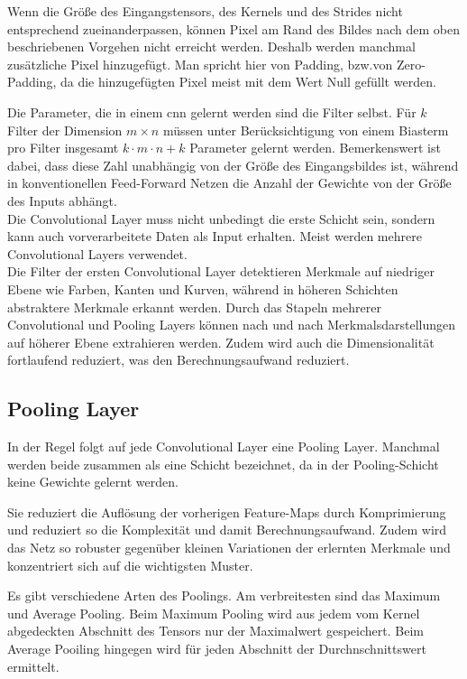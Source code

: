 Wenn die Größe des Eingangstensors, des Kernels und des Strides nicht entsprechend zueinanderpassen, können Pixel 
am Rand des Bildes nach dem oben beschriebenen Vorgehen nicht erreicht werden. Deshalb werden manchmal zusätzliche 
Pixel hinzugefügt. Man spricht hier von Padding, bzw.von Zero-Padding, da die hinzugefügten Pixel meist mit dem Wert Null 
gefüllt werden. \cite{Michelucci:2019}

Die Parameter, die in einem \ac{cnn} gelernt werden sind die Filter selbst. Für $k$ Filter der Dimension $m \times n$ 
müssen unter Berücksichtigung von einem Biasterm pro Filter insgesamt $k \cdot m \cdot n + k$ Parameter gelernt werden. 
Bemerkenswert ist dabei, dass diese Zahl unabhängig von der Größe des Eingangsbildes ist, während in konventionellen 
Feed-Forward Netzen die Anzahl der Gewichte von der Größe des Inputs abhängt.\cite{Michelucci:2019}\\

Die Convolutional Layer muss nicht unbedingt die erste Schicht sein, sondern kann auch vorverarbeitete Daten 
als Input erhalten. Meist werden mehrere Convolutional Layers verwendet.\cite{Michelucci:2019}\\
Die Filter der ersten Convolutional Layer detektieren Merkmale auf niedriger Ebene wie Farben, Kanten und Kurven, 
während in höheren Schichten abstraktere Merkmale erkannt werden. Durch das Stapeln mehrerer Convolutional 
und Pooling Layers können nach und nach Merkmalsdarstellungen auf höherer Ebene extrahieren werden. 
Zudem wird auch die Dimensionalität fortlaufend reduziert, was den Berechnungsaufwand reduziert. 
\cite{Gu:2018} \cite{Saha:2018}

\subsection{Pooling Layer}%
In der Regel folgt auf jede Convolutional Layer eine Pooling Layer. Manchmal werden beide zusammen 
als eine Schicht bezeichnet, da in der Pooling-Schicht keine Gewichte gelernt werden. \cite{Michelucci:2019}

Sie reduziert die Auflösung der vorherigen Feature-Maps durch Komprimierung und reduziert so die 
Komplexität und damit Berechnungsaufwand. Zudem wird das Netz so robuster gegenüber kleinen 
Variationen der erlernten Merkmale und konzentriert sich auf die wichtigsten Muster. \cite{Namatevs:2017}

Es gibt verschiedene Arten des Poolings. Am verbreitesten sind das Maximum und Average Pooling. 
Beim Maximum Pooling wird aus jedem vom Kernel abgedeckten Abschnitt des Tensors nur der Maximalwert gespeichert. 
Beim Average Pooiling hingegen wird für jeden Abschnitt der Durchnschnittswert ermittelt. \cite{Saha:2018}

